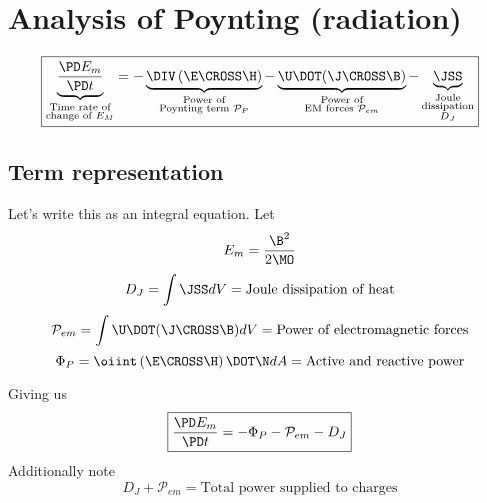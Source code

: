 \documentclass[11pt]{article}
\begin{document}
\doublespacing
\MOONSTITLE
\maketitle

\section{Analysis of Poynting (radiation)}

\begin{equation}
	\boxed{
	\underbrace{\frac{\PD E_m}{\PD t} }_
	{\substack{\text{Time rate of}\\\text{change of $E_M$}}}
	=
	- \underbrace{\DIV \left(\E \CROSS \H \right)}_
	{\substack{\text{Power of}\\\text{Poynting term $\mathcal P_{P}$}}}
	- \underbrace{\U \DOT (\J \CROSS \B)}_
	{\substack{\text{Power of}\\\text{EM forces $\mathcal P_{em}$}}}
	- \underbrace{\JSS}_
	{\substack{\text{Joule}\\\text{dissipation}\\\text{$D_J$}}}
	}
\end{equation}
\subsection{Term representation}
Let's write this as an integral equation. Let
\begin{equation}
	E_m = \frac{\B^2}{2 \MO}
\end{equation}
\begin{equation}
	D_J = \int \JSS dV = \text{Joule dissipation of heat}
\end{equation}
\begin{equation}
	\mathcal P_{em} = \int \U \DOT (\J \CROSS \B) dV = \text{Power of electromagnetic forces}
\end{equation}
\begin{equation}
	\Phi_P = \oiint \left( \E \CROSS \H \right) \DOT \N dA = \text{Active and reactive power}
\end{equation}

Giving us
\begin{equation}
	\boxed{
	\frac{\PD E_m}{\PD t}
	=
	- \Phi_P
	- \mathcal P_{em}
	- D_J
	}
\end{equation}
Additionally note
\begin{equation}
	D_J + \mathcal P_{em} = \text{Total power supplied to charges}
\end{equation}
\end{document}
